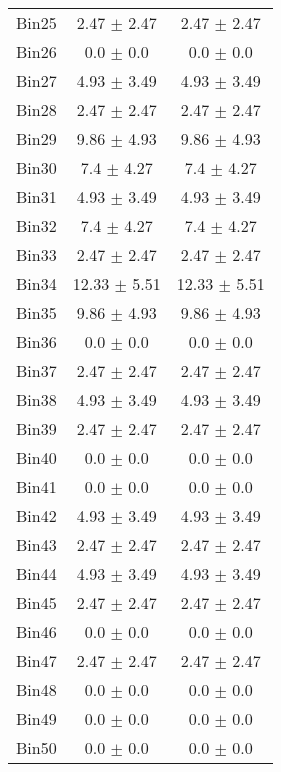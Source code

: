 \begin{tabular}{|c|c|c|}
     Bin25 & 2.47 $\pm$ 2.47 & 2.47 $\pm$ 2.47 \\ \cline{1-3} 
     Bin26 & 0.0 $\pm$ 0.0 & 0.0 $\pm$ 0.0 \\ \cline{1-3} 
     Bin27 & 4.93 $\pm$ 3.49 & 4.93 $\pm$ 3.49 \\ \cline{1-3} 
     Bin28 & 2.47 $\pm$ 2.47 & 2.47 $\pm$ 2.47 \\ \cline{1-3} 
     Bin29 & 9.86 $\pm$ 4.93 & 9.86 $\pm$ 4.93 \\ \cline{1-3} 
     Bin30 & 7.4 $\pm$ 4.27 & 7.4 $\pm$ 4.27 \\ \cline{1-3} 
     Bin31 & 4.93 $\pm$ 3.49 & 4.93 $\pm$ 3.49 \\ \cline{1-3} 
     Bin32 & 7.4 $\pm$ 4.27 & 7.4 $\pm$ 4.27 \\ \cline{1-3} 
     Bin33 & 2.47 $\pm$ 2.47 & 2.47 $\pm$ 2.47 \\ \cline{1-3} 
     Bin34 & 12.33 $\pm$ 5.51 & 12.33 $\pm$ 5.51 \\ \cline{1-3} 
     Bin35 & 9.86 $\pm$ 4.93 & 9.86 $\pm$ 4.93 \\ \cline{1-3} 
     Bin36 & 0.0 $\pm$ 0.0 & 0.0 $\pm$ 0.0 \\ \cline{1-3} 
     Bin37 & 2.47 $\pm$ 2.47 & 2.47 $\pm$ 2.47 \\ \cline{1-3} 
     Bin38 & 4.93 $\pm$ 3.49 & 4.93 $\pm$ 3.49 \\ \cline{1-3} 
     Bin39 & 2.47 $\pm$ 2.47 & 2.47 $\pm$ 2.47 \\ \cline{1-3} 
     Bin40 & 0.0 $\pm$ 0.0 & 0.0 $\pm$ 0.0 \\ \cline{1-3} 
     Bin41 & 0.0 $\pm$ 0.0 & 0.0 $\pm$ 0.0 \\ \cline{1-3} 
     Bin42 & 4.93 $\pm$ 3.49 & 4.93 $\pm$ 3.49 \\ \cline{1-3} 
     Bin43 & 2.47 $\pm$ 2.47 & 2.47 $\pm$ 2.47 \\ \cline{1-3} 
     Bin44 & 4.93 $\pm$ 3.49 & 4.93 $\pm$ 3.49 \\ \cline{1-3} 
     Bin45 & 2.47 $\pm$ 2.47 & 2.47 $\pm$ 2.47 \\ \cline{1-3} 
     Bin46 & 0.0 $\pm$ 0.0 & 0.0 $\pm$ 0.0 \\ \cline{1-3} 
     Bin47 & 2.47 $\pm$ 2.47 & 2.47 $\pm$ 2.47 \\ \cline{1-3} 
     Bin48 & 0.0 $\pm$ 0.0 & 0.0 $\pm$ 0.0 \\ \cline{1-3} 
     Bin49 & 0.0 $\pm$ 0.0 & 0.0 $\pm$ 0.0 \\ \cline{1-3} 
     Bin50 & 0.0 $\pm$ 0.0 & 0.0 $\pm$ 0.0 \\ \cline{1-3} 

\end{tabular}
